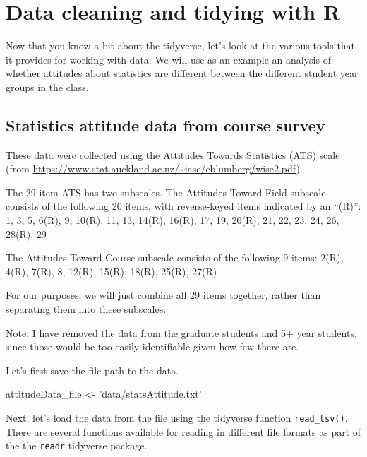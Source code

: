 \documentclass[12pt,]{book}
\newenvironment{Shaded}{\begin{snugshade}}{\end{snugshade}}
\newcommand{\NormalTok}[1]{#1}
\newcommand{\StringTok}[1]{\textcolor[rgb]{0.31,0.60,0.02}{#1}}
\begin{document}
\hypertarget{data-cleaning-and-tidying-with-r}{%
\section{Data cleaning and tidying with R}\label{data-cleaning-and-tidying-with-r}}

Now that you know a bit about the tidyverse, let's look at the various tools that it provides for working with data. We will use as an example an analysis of whether attitudes about statistics are different between the different student year groups in the class.

\hypertarget{statistics-attitude-data-from-course-survey}{%
\subsection{Statistics attitude data from course survey}\label{statistics-attitude-data-from-course-survey}}

These data were collected using the Attitudes Towards Statistics (ATS) scale (from \url{https://www.stat.auckland.ac.nz/~iase/cblumberg/wise2.pdf}).

The 29-item ATS has two subscales. The Attitudes Toward Field subscale consists of the following 20 items, with reverse-keyed items indicated by an ``(R)'':
1, 3, 5, 6(R), 9, 10(R), 11, 13, 14(R), 16(R), 17, 19, 20(R), 21, 22, 23, 24, 26, 28(R), 29

The Attitudes Toward Course subscale consists of the following 9 items:
2(R), 4(R), 7(R), 8, 12(R), 15(R), 18(R), 25(R), 27(R)

For our purposes, we will just combine all 29 items together, rather than separating them into these subscales.

Note: I have removed the data from the graduate students and 5+ year students, since those would be too easily identifiable given how few there are.

Let's first save the file path to the data.

\begin{Shaded}
\begin{Highlighting}[]
\NormalTok{attitudeData_file <-}\StringTok{ 'data/statsAttitude.txt'}
\end{Highlighting}
\end{Shaded}

Next, let's load the data from the file using the tidyverse function \texttt{read\_tsv()}. There are several functions available for reading in different file formats as part of the the \texttt{readr} tidyverse package.
\end{document}
